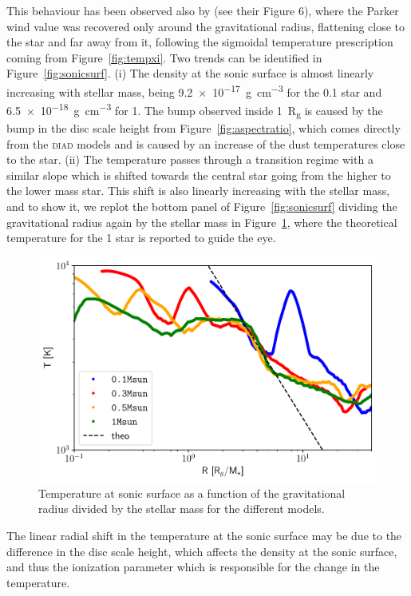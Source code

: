 \documentclass[usenatbib,useAMS,usedcolumn]{mnras}
\begin{document}
This behaviour has been observed also by  (see their Figure 6), where the Parker wind value was recovered only around the gravitational radius, flattening close to the star and far away from it, following the sigmoidal temperature prescription coming from Figure~\ref{fig:tempxi}.
Two trends can be identified in Figure~\ref{fig:sonicsurf}.
(i) The density at the sonic surface is almost linearly increasing with stellar mass, being \SI{9.2e-17}{g.cm^{-3}} for the \SI{0.1}{\solarmass} star and \SI{6.5e-18}{g.cm^{-3}} for \SI{1}{\solarmass}. The bump observed inside \SI{1}{R_g} is caused by the bump in the disc scale height from Figure~\ref{fig:aspectratio}, which comes directly from the \textsc{diad} models and is caused by an increase of the dust temperatures close to the star.
(ii) The temperature passes through a transition regime with a similar slope which is shifted towards the central star going from the higher to the lower mass star. This shift is also linearly increasing with the stellar mass, and to show it, we replot the bottom panel of Figure~\ref{fig:sonicsurf} dividing the gravitational radius again by the stellar mass in Figure~\ref{fig:sonicsurfrescaled}, where the theoretical temperature for the \SI{1}{\solarmass} star is reported to guide the eye.
\begin{figure}
    \centering
    \includegraphics[width=\columnwidth]{Figure10}
    \caption{Temperature at sonic surface as a function of the gravitational radius divided by the stellar mass for the different models. \label{fig:sonicsurfrescaled}}
\end{figure}
The linear radial shift in the temperature at the sonic surface may be due to the difference in the disc scale height, which affects the density at the sonic surface, and thus the ionization parameter which is responsible for the change in the temperature. 
\end{document}
